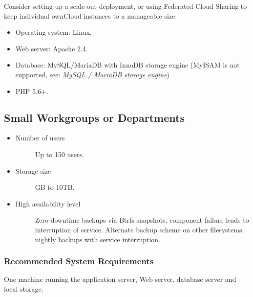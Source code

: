 \documentclass[letterpaper,10pt,english]{sphinxmanual}
\begin{document}
Consider setting up a scale-out deployment, or using Federated Cloud Sharing to
keep individual ownCloud instances to a manageable size.
\begin{itemize}
\item {} 
Operating system: Linux.

\item {} 
Web server: Apache 2.4.

\item {} 
Database: MySQL/MariaDB with InnoDB storage engine (MyISAM is not supported, see: {\hyperref[configuration_database/linux_database_configuration:db\string-storage\string-engine\string-label]{\emph{MySQL / MariaDB storage engine}}})

\item {} 
PHP 5.6+.

\end{itemize}


\subsection{Small Workgroups or Departments}
\label{installation/deployment_recommendations:small-workgroups-or-departments}\begin{itemize}
\item {} \begin{description}
\item[{Number of users}] \leavevmode
Up to 150 users.

\end{description}

\item {} \begin{description}
\item[{Storage size}]  GB to 10TB.

\end{description}

\item {} \begin{description}
\item[{High availability level}] \leavevmode
Zero-downtime backups via Btrfs snapshots, component failure leads to
interruption of service. Alternate backup scheme on other filesystems:
nightly backups with service interruption.

\end{description}

\end{itemize}


\subsubsection{Recommended System Requirements}
\label{installation/deployment_recommendations:recommended-system-requirements}
One machine running the application server, Web server, database server and
local storage.
\end{document}
